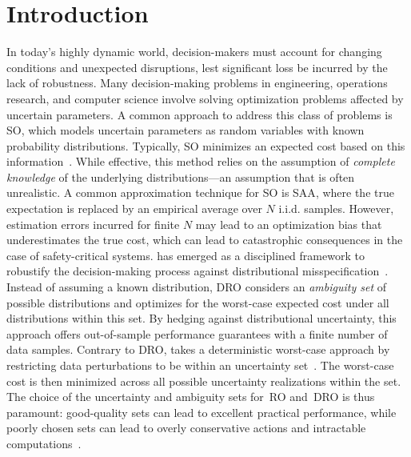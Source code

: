 \chapter{Introduction}
\label{chap:intro}

In today's highly dynamic world, decision-makers must account for changing conditions and unexpected disruptions, lest significant loss be incurred by the lack of robustness.
Many decision-making problems in engineering, operations research, and computer science involve solving optimization problems affected by uncertain parameters.
A common approach to address this class of problems is \gls{SO}, which models uncertain parameters as random variables with known probability distributions.
Typically, \gls{SO} minimizes an expected cost based on this information~\cite{shapiro2021lectures}. 
While effective, this method relies on the assumption of {\it complete knowledge} of the underlying distributions—an assumption that is often unrealistic. A common approximation technique for \gls{SO} is \gls{SAA}, where the true expectation is replaced by an empirical average over $N$ i.i.d. samples.
However, estimation errors incurred for finite $N$ may lead to an optimization bias that underestimates the true cost, which can lead to catastrophic consequences in the case of safety-critical systems.
 has emerged as a disciplined framework to robustify the decision-making process against distributional misspecification~\cite{dro_survey,kuhn_dro_book}.
Instead of assuming a known distribution, \gls{DRO} considers an \emph{ambiguity set} of possible distributions and optimizes for the worst-case expected cost under all distributions within this set.
By hedging against distributional uncertainty, this approach offers  out-of-sample performance guarantees with a finite number of data samples. 
Contrary to \gls{DRO},  takes a deterministic worst-case approach by restricting data perturbations to be within an uncertainty set~\cite{ben-tal_robust_2000}. The worst-case cost is then minimized across all possible uncertainty realizations within the set. The choice of the uncertainty and ambiguity sets for~\gls{RO} and~\gls{DRO} is thus paramount: good-quality sets can lead to excellent practical performance, while poorly chosen sets can lead to overly conservative actions and intractable computations~\citep{ben-tal_robust_2009}. 

